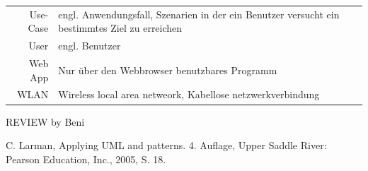 \documentclass[a4paper,10pt,xetex]{article}
\begin{document}
\begin{longtable}[]{@{}rl@{}}
\begin{minipage}[t]{0.18\columnwidth}\raggedleft\strut
Use-Case\strut
\end{minipage} & \begin{minipage}[t]{0.76\columnwidth}\raggedright\strut
engl. Anwendungsfall, Szenarien in der ein Benutzer versucht ein
bestimmtes Ziel zu erreichen\strut
\end{minipage}\tabularnewline
\begin{minipage}[t]{0.18\columnwidth}\raggedleft\strut
User\strut
\end{minipage} & \begin{minipage}[t]{0.76\columnwidth}\raggedright\strut
engl. Benutzer\strut
\end{minipage}\tabularnewline
\begin{minipage}[t]{0.18\columnwidth}\raggedleft\strut
Web App\strut
\end{minipage} & \begin{minipage}[t]{0.76\columnwidth}\raggedright\strut
Nur über den Webbrowser benutzbares Programm\strut
\end{minipage}\tabularnewline
\begin{minipage}[t]{0.18\columnwidth}\raggedleft\strut
WLAN\strut
\end{minipage} & \begin{minipage}[t]{0.76\columnwidth}\raggedright\strut
Wireless local area netweork, Kabellose netzwerkverbindung\strut
\end{minipage}\tabularnewline
\bottomrule
\end{longtable}

REVIEW by Beni

\begin{thebibliography}{9}
C. Larman, Applying UML and patterns. 4. Auflage, Upper Saddle River: Pearson Education, Inc., 2005, S. 18.
\end{thebibliography}
\end{document}
